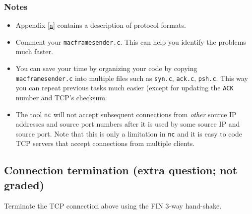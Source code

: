 \documentclass[pdftex,12pt,a4paper]{article}
\begin{document}
            \subsubsection{Notes}
                \begin{itemize}
                    \item Appendix \ref{a} contains a description of protocol
                        formats.
                    \item Comment your \texttt{macframesender.c}. This can
                        help you identify the problems much faster.
                    \item You can save your time by organizing your code by
                        copying \texttt{macframesender.c} into multiple files
                        such as \texttt{syn.c}, \texttt{ack.c}, \texttt{psh.c}.
                        This way you can repeat previous tasks much easier
                        (except for updating the \texttt{ACK} number and TCP's
                        checksum.
                    \item The tool \texttt{nc} will not accept subsequent
                        connections from \emph{other} source IP addresses and
                        source port numbers after it is used by some source IP
                        and source port. Note that this is only a limitation in
                        \texttt{nc} and it is easy to code TCP servers that
                        accept connections from multiple clients.
                \end{itemize}

        \subsection{Connection termination (extra question; not graded)}
            Terminate the TCP connection above using the FIN 3-way hand-shake.
            

    \newpage
    \appendix
\end{document}
